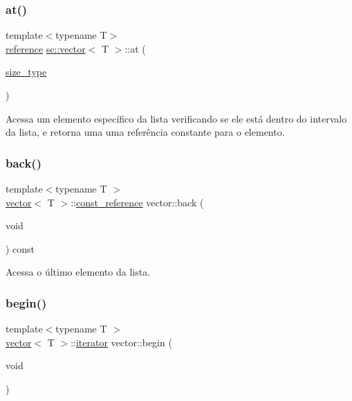\subsubsection{\texorpdfstring{at()}{at()}\hspace{0.1cm}{\footnotesize\ttfamily [2/2]}}
{\footnotesize\ttfamily template$<$typename T$>$ \\
\hyperlink{classsc_1_1vector_a37394c8a6b82c4a0709737d7982e32b2}{reference} \hyperlink{classsc_1_1vector}{sc\+::vector}$<$ T $>$\+::at (\begin{DoxyParamCaption}\item[{\hyperlink{classsc_1_1vector_a48bf37ba1a6d0c13504414d86e27c399}{size\+\_\+type}}]{ }\end{DoxyParamCaption})}



Acessa um elemento específico da lista verificando se ele está dentro do intervalo da lista, e retorna uma uma referência constante para o elemento. 

\mbox{\label{classsc_1_1vector_a3b924e6f20777a29ef818a1805c7b357}} 
\subsubsection{\texorpdfstring{back()}{back()}}
{\footnotesize\ttfamily template$<$typename T $>$ \\
\hyperlink{classsc_1_1vector}{vector}$<$ T $>$\+::\hyperlink{classsc_1_1vector_a8da2b1a11b069241100f9b2e14f481a0}{const\+\_\+reference} vector\+::back (\begin{DoxyParamCaption}\item[{void}]{ }\end{DoxyParamCaption}) const}



Acessa o último elemento da lista. 

\mbox{\label{classsc_1_1vector_ae198130cd01e8d5a4df07d6567b51eb4}} 
\subsubsection{\texorpdfstring{begin()}{begin()}}
{\footnotesize\ttfamily template$<$typename T $>$ \\
\hyperlink{classsc_1_1vector}{vector}$<$ T $>$\+::\hyperlink{classsc_1_1vector_a9e5d5cc35e379aa27a93989f4a71413c}{iterator} vector\+::begin (\begin{DoxyParamCaption}\item[{void}]{ }\end{DoxyParamCaption})}



